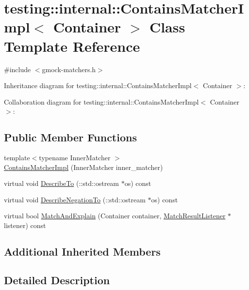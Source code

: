 \hypertarget{classtesting_1_1internal_1_1_contains_matcher_impl}{}\section{testing\+:\+:internal\+:\+:Contains\+Matcher\+Impl$<$ Container $>$ Class Template Reference}
\label{classtesting_1_1internal_1_1_contains_matcher_impl}


{\ttfamily \#include $<$gmock-\/matchers.\+h$>$}



Inheritance diagram for testing\+:\+:internal\+:\+:Contains\+Matcher\+Impl$<$ Container $>$\+:


Collaboration diagram for testing\+:\+:internal\+:\+:Contains\+Matcher\+Impl$<$ Container $>$\+:
\subsection*{Public Member Functions}
\begin{DoxyCompactItemize}
\item 
{\footnotesize template$<$typename Inner\+Matcher $>$ }\\\hyperlink{classtesting_1_1internal_1_1_contains_matcher_impl_a3fd56f21081068101a76ebe05fc1d7f4}{Contains\+Matcher\+Impl} (Inner\+Matcher inner\+\_\+matcher)
\item 
virtual void \hyperlink{classtesting_1_1internal_1_1_contains_matcher_impl_a8fa3ebe5a6ba6ccc21c6f9aa6c6bbdb9}{Describe\+To} (\+::std\+::ostream $\ast$os) const 
\item 
virtual void \hyperlink{classtesting_1_1internal_1_1_contains_matcher_impl_aa8448326064567a1c61ef027a241459c}{Describe\+Negation\+To} (\+::std\+::ostream $\ast$os) const 
\item 
virtual bool \hyperlink{classtesting_1_1internal_1_1_contains_matcher_impl_aa70ab361eb1d4f2aa01d2cee3ef4cb25}{Match\+And\+Explain} (Container container, \hyperlink{classtesting_1_1_match_result_listener}{Match\+Result\+Listener} $\ast$listener) const 
\end{DoxyCompactItemize}
\subsection*{Additional Inherited Members}


\subsection{Detailed Description}
